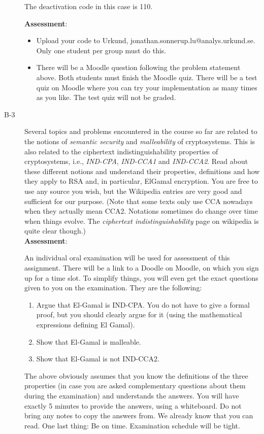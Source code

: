 \documentclass{article}
\begin{document}
\begin{description}
{			The deactivation code in this case is 110.
			
			\textbf{Assessment}:
			\begin{itemize}
				\item Upload your code to Urkund, jonathan.sonnerup.lu@analys.urkund.se. Only one student per group must do this.
				\item There will be a Moodle question following the problem statement above. Both students must finish the Moodle quiz. There will be	a test quiz on Moodle where you can try your implementation as many times as you like. The test quiz will not be graded.
			\end{itemize}}
			
			\item[B-3]{Several topics and problems encountered in the course so far are related to the notions of \textit{semantic security} and \textit{malleability} of cryptosystems. This is also related to the ciphertext indistinguishability properties of cryptosystems, i.e., \textit{IND-CPA}, \textit{IND-CCA1} and \textit{IND-CCA2}. Read about these different notions and understand their properties, definitions and how they apply to RSA and, in particular, ElGamal encryption. You are free to use any source you wish, but the Wikipedia entries are very good and sufficient for our purpose. (Note that some texts only use CCA nowadays when they actually mean CCA2. Notations sometimes do change over time when things evolve. The \textit{ciphertext indistinguishability} page on wikipedia is quite clear though.)\\
				\textbf{Assessment}:

			An individual oral examination will be used for assessment of this assignment. There will be a link to a Doodle on Moodle, on which you sign up for a time slot. To simplify things, you will even get the exact questions given to you on the examination. They are the following:
			\begin{enumerate}
				\item Argue that El-Gamal is IND-CPA. You do not have to give a formal proof, but you should clearly argue for it (using the mathematical expressions defining El Gamal).
				\item Show that El-Gamal is malleable.
				\item Show that El-Gamal is not IND-CCA2.
			\end{enumerate}
			The above obviously assumes that you know the definitions of the three properties (in case you are asked complementary questions about them during the examination) and understands the answers. You will have exactly 5 minutes to provide the answers, using a whiteboard. Do not bring any notes to copy the answers from. We already know that you can read. One last thing: Be on time. Examination schedule will be tight.}
			\end{description}
		
\end{document}
